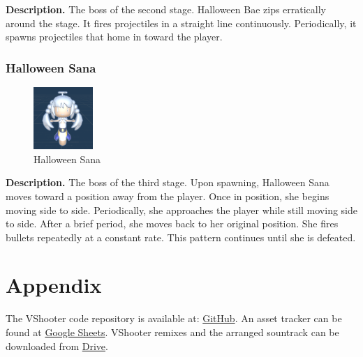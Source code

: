 \documentclass[10pt, a4paper]{article}
\begin{document}
\begin{multicols}{2}
	\textbf{Description.} The boss of the second stage. Halloween Bae zips erratically around the stage. It fires projectiles in a straight line continuously. Periodically, it spawns projectiles that home in toward the player.

	\subsubsection{Halloween Sana}

	\begin{figure}[H]
		\centering
		\includegraphics[width=0.2\textwidth]{images/halloween_sana1.png}
		\caption{Halloween Sana}
		\label{fig:halloweensana}
	\end{figure}

	\textbf{Description.} The boss of the third stage. Upon spawning, Halloween Sana moves toward a position away from the player. Once in position, she begins moving side to side. Periodically, she approaches the player while still moving side to side. After a brief period, she moves back to her original position. She fires bullets repeatedly at a constant rate. This pattern continues until she is defeated.

	\section{Appendix}

	The VShooter code repository is available at: \href{https://github.com/giociudadano/VShooter.git}{GitHub}. An asset tracker can be found at \href{https://docs.google.com/spreadsheets/d/1iixa0Slci229xnzVG4J9bXTK8P0FVPwnDIEXkRsuH7s/edit?usp=sharing}{Google Sheets}. VShooter remixes and the arranged sountrack can be downloaded from \href{https://drive.google.com/drive/folders/1lVz1maZ6dL9_K4PAbTF3IGDHxGWFrajg?usp=drive_link}{Drive}.

	\end{multicols}
\end{document}
